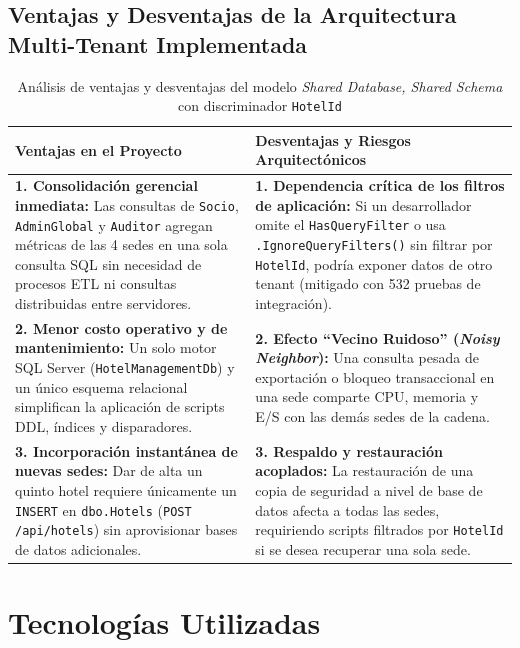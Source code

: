 \documentclass[12pt,a4paper]{article}
\begin{document}
\subsection{Ventajas y Desventajas de la Arquitectura Multi-Tenant Implementada}
\begin{table}[H]
\centering
\caption{An\'alisis de ventajas y desventajas del modelo \textit{Shared Database, Shared Schema} con discriminador \texttt{HotelId}}
\label{tab:ventajas_desventajas_mt}
\begin{tabular}{p{7.4cm} p{7.4cm}}
\toprule
\textbf{Ventajas en el Proyecto} & \textbf{Desventajas y Riesgos Arquitect\'onicos}\\
\midrule
\textbf{1. Consolidaci\'on gerencial inmediata:} Las consultas de \texttt{Socio}, \texttt{AdminGlobal} y \texttt{Auditor} agregan m\'etricas de las 4 sedes en una sola consulta SQL sin necesidad de procesos ETL ni consultas distribuidas entre servidores. & \textbf{1. Dependencia cr\'itica de los filtros de aplicaci\'on:} Si un desarrollador omite el \texttt{HasQueryFilter} o usa \texttt{.IgnoreQueryFilters()} sin filtrar por \texttt{HotelId}, podr\'ia exponer datos de otro tenant (mitigado con 532 pruebas de integraci\'on).\\[0.2cm]
\textbf{2. Menor costo operativo y de mantenimiento:} Un solo motor SQL Server (\texttt{HotelManagementDb}) y un \'unico esquema relacional simplifican la aplicaci\'on de scripts DDL, \'indices y disparadores. & \textbf{2. Efecto ``Vecino Ruidoso'' (\textit{Noisy Neighbor}):} Una consulta pesada de exportaci\'on o bloqueo transaccional en una sede comparte CPU, memoria y E/S con las dem\'as sedes de la cadena.\\[0.2cm]
\textbf{3. Incorporaci\'on instant\'anea de nuevas sedes:} Dar de alta un quinto hotel requiere \'unicamente un \texttt{INSERT} en \texttt{dbo.Hotels} (\texttt{POST /api/hotels}) sin aprovisionar bases de datos adicionales. & \textbf{3. Respaldo y restauraci\'on acoplados:} La restauraci\'on de una copia de seguridad a nivel de base de datos afecta a todas las sedes, requiriendo scripts filtrados por \texttt{HotelId} si se desea recuperar una sola sede.\\
\bottomrule
\end{tabular}
\end{table}

\section{Tecnolog\'ias Utilizadas}
\end{document}
